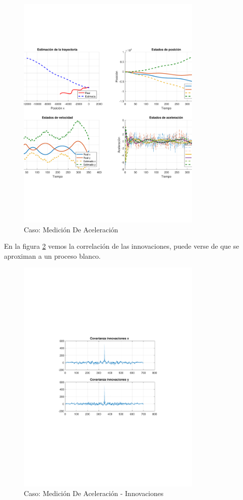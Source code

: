 		\begin{figure}[H]
			\centering
			\includegraphics[width=0.8\textwidth,keepaspectratio]{Figuras/graf_ej2c.pdf}
			\caption{Caso: Medición De Aceleración}
			\label{fig:ej2c}
		\end{figure}
		
		En la figura \ref{fig:ej2c_innov} vemos la correlación de las innovaciones, puede verse de que se aproximan a un proceso blanco.
		
		\begin{figure}[H]
			\centering
			\includegraphics[width=0.8\textwidth,keepaspectratio]{Figuras/covinn_ej2c.pdf}
			\caption{Caso: Medición De Aceleración - Innovaciones}
			\label{fig:ej2c_innov}
		\end{figure}


